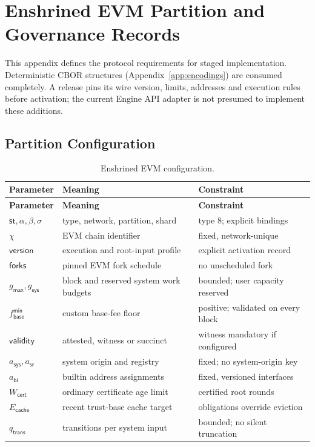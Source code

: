 \chapter{Enshrined EVM Partition and Governance Records}\label{app:evm}

This appendix defines the protocol requirements for staged implementation. Deterministic CBOR structures (Appendix~\ref{app:encodings}) are consumed completely. A release pins its wire version, limits, addresses and execution rules before activation; the current Engine API adapter is not presumed to implement these additions.

\section{Partition Configuration}\label{app:evm-config}

\begin{longtable}{p{2.8cm}p{6.4cm}p{4.0cm}}
\caption{Enshrined EVM configuration.}\label{ta:evm-config}\\
\textbf{Parameter} & \textbf{Meaning} & \textbf{Constraint}\\ \hline
\endfirsthead
\textbf{Parameter} & \textbf{Meaning} & \textbf{Constraint}\\ \hline
\endhead
$\mathsf{st},\alpha,\beta,\sigma$ & type, network, partition, shard & type $8$; explicit bindings\\
$\chi$ & EVM chain identifier & fixed, network-unique\\
$\mathsf{version}$ & execution and root-input profile & explicit activation record\\
$\mathsf{forks}$ & pinned EVM fork schedule & no unscheduled fork\\
$g_\mathsf{max},g_\mathsf{sys}$ & block and reserved system work budgets & bounded; user capacity reserved\\
$f_\mathsf{base}^\mathsf{min}$ & custom base-fee floor & positive; validated on every block\\
$\mathsf{validity}$ & attested, witness or succinct & witness mandatory if configured\\
$a_\mathsf{sys},a_\mathsf{sr}$ & system origin and registry & fixed; no system-origin key\\
$a_\mathsf{bi}$ & builtin address assignments & fixed, versioned interfaces\\
$W_\mathsf{cert}$ & ordinary certificate age limit & certified root rounds\\
$E_\mathsf{cache}$ & recent trust-base cache target & obligations override eviction\\
$q_\mathsf{trans}$ & transitions per system input & bounded; no silent truncation\\
\end{longtable}

